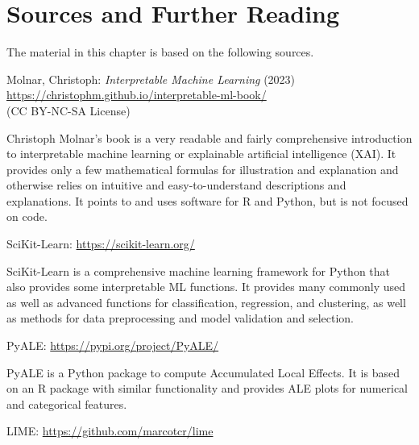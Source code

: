 %
%

\section*{Sources and Further Reading}

The material in this chapter is based on the following sources.

\begin{tcolorbox}[colback=alert]
Molnar, Christoph: \emph{Interpretable Machine Learning} (2023) \\

\url{https://christophm.github.io/interpretable-ml-book/} \\

(CC BY-NC-SA License)
\end{tcolorbox}

Christoph Molnar's book is a very readable and fairly comprehensive introduction to interpretable machine learning or explainable artificial intelligence (XAI). It provides only a few mathematical formulas for illustration and explanation and otherwise relies on intuitive and easy-to-understand descriptions and explanations. It points to and uses software for R and Python, but is not focused on code.

\begin{tcolorbox}[colback=alert]
SciKit-Learn: \url{https://scikit-learn.org/}
\end{tcolorbox}

SciKit-Learn is a comprehensive machine learning framework for Python that also provides some interpretable ML functions. It provides many commonly used as well as advanced functions for classification, regression, and clustering, as well as methods for data preprocessing and model validation and selection.

\begin{tcolorbox}[colback=alert]
PyALE: \url{https://pypi.org/project/PyALE/}
\end{tcolorbox}

PyALE is a Python package to compute Accumulated Local Effects. It is based on an R package with similar functionality and provides ALE plots for numerical and categorical features.

\begin{tcolorbox}[colback=alert]
LIME: \url{https://github.com/marcotcr/lime}
\end{tcolorbox}

